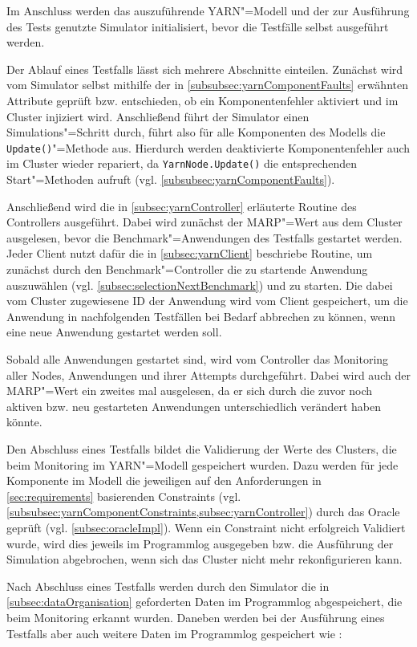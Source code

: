 Im Anschluss werden das auszuführende \ac{YARN}"=Modell und der zur Ausführung des Tests genutzte Simulator initialisiert, bevor die Testfälle selbst ausgeführt werden.

Der Ablauf eines Testfalls lässt sich mehrere Abschnitte einteilen.
Zunächst wird vom Simulator selbst mithilfe der in \cref{subsubsec:yarnComponentFaults} erwähnten Attribute geprüft bzw. entschieden, ob ein Komponentenfehler aktiviert und im Cluster injiziert wird.
Anschließend führt der Simulator einen Simulations"=Schritt durch, führt also für alle Komponenten des Modells die \texttt{Update()}"=Methode aus.
Hierdurch werden deaktivierte Komponentenfehler auch im Cluster wieder repariert, da \texttt{YarnNode.Update()} die entsprechenden Start"=Methoden aufruft (vgl. \cref{subsubsec:yarnComponentFaults}).

Anschließend wird die in \cref{subsec:yarnController} erläuterte Routine des Controllers ausgeführt.
Dabei wird zunächst der \ac{MARP}"=Wert aus dem Cluster ausgelesen, bevor die Benchmark"=Anwendungen des Testfalls gestartet werden.
Jeder Client nutzt dafür die in \cref{subsec:yarnClient} beschriebe Routine, um zunächst durch den Benchmark"=Controller die zu startende Anwendung auszuwählen (vgl. \cref{subsec:selectionNextBenchmark}) und zu starten.
Die dabei vom Cluster zugewiesene ID der Anwendung wird vom Client gespeichert, um die Anwendung in nachfolgenden Testfällen bei Bedarf abbrechen zu können, wenn eine neue Anwendung gestartet werden soll.

Sobald alle Anwendungen gestartet sind, wird vom Controller das Monitoring aller Nodes, Anwendungen und ihrer Attempts durchgeführt.
Dabei wird auch der \ac{MARP}"=Wert ein zweites mal ausgelesen, da er sich durch die zuvor noch aktiven bzw. neu gestarteten Anwendungen unterschiedlich verändert haben könnte.

Den Abschluss eines Testfalls bildet die Validierung der Werte des Clusters, die beim Monitoring im \ac{YARN}"=Modell gespeichert wurden.
Dazu werden für jede Komponente im Modell die jeweiligen auf den Anforderungen in \cref{sec:requirements} basierenden Constraints (vgl. \cref{subsubsec:yarnComponentConstraints,subsec:yarnController}) durch das Oracle geprüft (vgl. \cref{subsec:oracleImpl}).
Wenn ein Constraint nicht erfolgreich Validiert wurde, wird dies jeweils im Programmlog ausgegeben bzw. die Ausführung der Simulation abgebrochen, wenn sich das Cluster nicht mehr rekonfigurieren kann.

Nach Abschluss eines Testfalls werden durch den Simulator die in \cref{subsec:dataOrganisation} geforderten Daten im Programmlog abgespeichert, die beim Monitoring erkannt wurden.
Daneben werden bei der Ausführung eines Testfalls aber auch weitere Daten im Programmlog gespeichert wie \zB:

